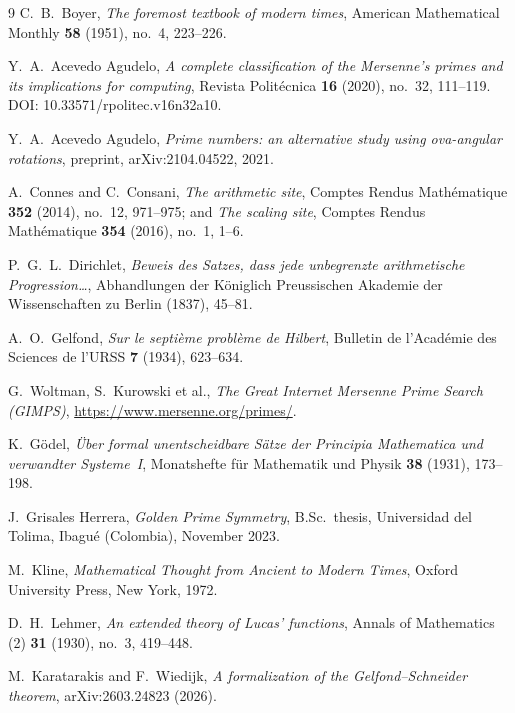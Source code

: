 \documentclass[11pt]{amsart}
\theoremstyle{definition}
\begin{document}
\begin{thebibliography}{9}
C.~B.~Boyer,
\textit{The foremost textbook of modern times},
American Mathematical Monthly \textbf{58} (1951), no.~4, 223--226.

Y.~A.~Acevedo Agudelo,
\textit{A complete classification of the Mersenne's primes and its
implications for computing},
Revista Politécnica \textbf{16} (2020), no.~32, 111--119.
DOI: 10.33571/rpolitec.v16n32a10.

Y.~A.~Acevedo Agudelo,
\textit{Prime numbers: an alternative study using ova-angular
rotations},
preprint, arXiv:2104.04522, 2021.

A.~Connes and C.~Consani,
\textit{The arithmetic site},
Comptes Rendus Mathématique \textbf{352} (2014), no.~12, 971--975;
and \textit{The scaling site},
Comptes Rendus Mathématique \textbf{354} (2016), no.~1, 1--6.

P.~G.~L.~Dirichlet,
\textit{Beweis des Satzes, dass jede unbegrenzte arithmetische
Progression\ldots},
Abhandlungen der Königlich Preussischen Akademie der Wissenschaften
zu Berlin (1837), 45--81.

A.~O.~Gelfond,
\textit{Sur le septième problème de Hilbert},
Bulletin de l'Académie des Sciences de l'URSS \textbf{7} (1934), 623--634.

G.~Woltman, S.~Kurowski et al.,
\textit{The Great Internet Mersenne Prime Search (GIMPS)},
\url{https://www.mersenne.org/primes/}.

K.~Gödel,
\textit{Über formal unentscheidbare Sätze der Principia Mathematica
und verwandter Systeme~I},
Monatshefte für Mathematik und Physik \textbf{38} (1931), 173--198.

J.~Grisales Herrera,
\textit{Golden Prime Symmetry},
B.Sc.\ thesis, Universidad del Tolima, Ibagué (Colombia),
November 2023.

M.~Kline,
\textit{Mathematical Thought from Ancient to Modern Times},
Oxford University Press, New York, 1972.

D.~H.~Lehmer,
\textit{An extended theory of Lucas' functions},
Annals of Mathematics (2) \textbf{31} (1930), no.~3, 419--448.

M.~Karatarakis and F.~Wiedijk,
\textit{A formalization of the Gelfond--Schneider theorem},
arXiv:2603.24823 (2026).


\end{thebibliography}
\end{document}
